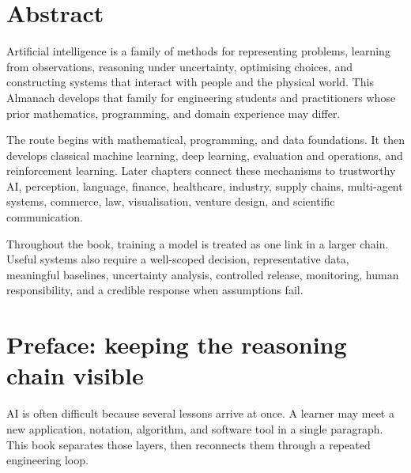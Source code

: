 \chapter*{Abstract}

Artificial intelligence is a family of methods for representing problems,
learning from observations, reasoning under uncertainty, optimising choices,
and constructing systems that interact with people and the physical world.
This Almanach develops that family for engineering students and practitioners
whose prior mathematics, programming, and domain experience may differ.

The route begins with mathematical, programming, and data foundations. It
then develops classical machine learning, deep learning, evaluation and
operations, and reinforcement learning. Later chapters connect these
mechanisms to trustworthy AI, perception, language, finance, healthcare,
industry, supply chains, multi-agent systems, commerce, law, visualisation,
venture design, and scientific communication.

Throughout the book, training a model is treated as one link in a larger
chain. Useful systems also require a well-scoped decision, representative
data, meaningful baselines, uncertainty analysis, controlled release,
monitoring, human responsibility, and a credible response when assumptions
fail.

\chapter*{Preface: keeping the reasoning chain visible}

AI is often difficult because several lessons arrive at once. A learner may
meet a new application, notation, algorithm, and software tool in a single
paragraph. This book separates those layers, then reconnects them through a
repeated engineering loop.

